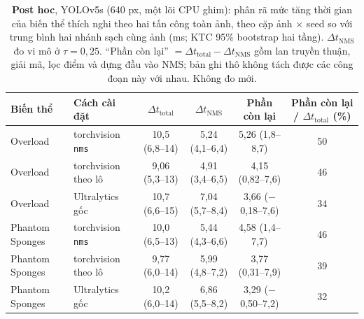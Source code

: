 \begin{table}[t]
\centering\small
\caption{\textbf{Post hoc}, YOLOv5s (640 px, một lõi CPU ghim): phân rã mức tăng thời gian của biến thể thích nghi theo hai tấn công toàn ảnh, theo cặp ảnh $\times$ seed so với trung bình hai nhánh sạch cùng ảnh (ms; KTC 95\% bootstrap hai tầng). $\Delta t_{\mathrm{NMS}}$ đo vi mô ở $\tau=0{,}25$. ``Phần còn lại'' $=\Delta t_{\mathrm{total}}-\Delta t_{\mathrm{NMS}}$ gồm lan truyền thuận, giải mã, lọc điểm và dựng đầu vào NMS; bản ghi thô không tách được các công đoạn này với nhau. Không đo mới.}
\label{tab:decomp}
\begin{tabular}{@{}llcccc@{}}
\toprule
Biến thể & Cách cài đặt & $\Delta t_{\mathrm{total}}$ & $\Delta t_{\mathrm{NMS}}$ & Phần còn lại & Phần còn lại / $\Delta t_{\mathrm{total}}$ (\%) \\
\midrule
Overload & torchvision \texttt{nms} & 10,5 (6,8--14) & 5,24 (4,1--6,4) & 5,26 (1,8--8,7) & 50 \\
Overload & torchvision theo lô & 9,06 (5,3--13) & 4,91 (3,4--6,5) & 4,15 (0,82--7,6) & 46 \\
Overload & Ultralytics gốc & 10,7 (6,6--15) & 7,04 (5,7--8,4) & 3,66 ($-$0,18--7,6) & 34 \\
Phantom Sponges & torchvision \texttt{nms} & 10,0 (6,5--13) & 5,44 (4,3--6,6) & 4,58 (1,4--7,7) & 46 \\
Phantom Sponges & torchvision theo lô & 9,77 (6,0--14) & 5,99 (4,8--7,2) & 3,77 (0,31--7,9) & 39 \\
Phantom Sponges & Ultralytics gốc & 10,2 (6,0--14) & 6,86 (5,5--8,2) & 3,29 ($-$0,50--7,2) & 32 \\
\bottomrule
\end{tabular}
\end{table}

